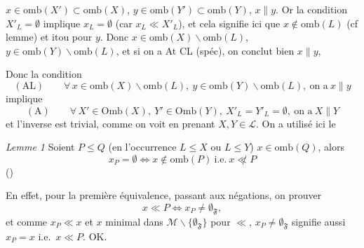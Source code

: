 \documentclass[11pt,a4paper]{article}
\begin{document}

\ill{} \ill{} $x \in \mathrm{omb}(X') \subset \mathrm{omb}(X)$, $y \in \mathrm{omb}(Y') \subset \mathrm{omb}(Y)$, \ill{} $x \parallel y$. Or la condition $X'_L = \emptyset$ implique $x_L = \emptyset$ (car $x_L \ll X'_L$), et \struck{\ill{}} cela signifie ici que $x \notin \mathrm{omb}(L)$ (cf lemme) et itou pour $y$. Donc $x \in \mathrm{omb}(X) \smallsetminus \mathrm{omb}(L)$, $y \in \mathrm{omb}(Y) \smallsetminus \mathrm{omb}(L)$, et si on a At CL (spéc), on conclut bien $x \parallel y$,

\struck{\ill{}} Donc la condition
\[
  (\mathrm{AL}) \qquad \forall\, x \in \mathrm{omb}(X) \smallsetminus \mathrm{omb}(L),\ y \in \mathrm{omb}(Y) \smallsetminus \mathrm{omb}(L), \ \text{on a}\ x \parallel y
\]
implique
\[
  (\mathrm{A}) \qquad \forall\, X' \in \mathrm{Omb}(X),\ Y' \in \mathrm{Omb}(Y),\ X'_L = Y'_L = \emptyset, \ \text{on a}\ X \parallel Y
\]
et l'inverse est trivial, comme on voit en prenant $X, Y \in \mathcal{L}$. On a utilisé ici le

\emph{Lemme 1} Soient  $P \leq Q$ (en l'occurrence \struck{\ill{}} $L \leq X$ ou $L \leq Y$) $x \in \mathrm{omb}(Q)$, alors 
\[
  x_P = \emptyset \iff x \notin \mathrm{omb}(P) \ \text{i.e.}\ x \not\ll P
\]
(\struck{\ill{}})

En effet,  pour la première équivalence, passant aux négations, on   prouver
\[
  x \ll P \iff x_P \neq \emptyset_{\mathfrak{F}} ,
\]
et comme $x_P \ll x$ et $x$ minimal dans $\mathcal{M} \smallsetminus \lbrace \emptyset_{\mathfrak{F}} \rbrace$ pour $\ll$, $x_P \neq \emptyset_{\mathfrak{F}}$ signifie aussi $x_P = x$ i.e.\ $x \ll P$. OK.
\end{document}
